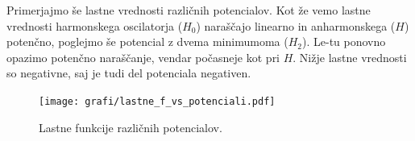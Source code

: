 \documentclass[12pt, a4paper]{article}
\begin{document}
Primerjajmo še lastne vrednosti različnih potencialov. Kot že vemo lastne vrednosti harmonskega oscilatorja ($H_0$) naraščajo linearno in anharmonskega ($H$) potenčno, poglejmo še potencial z dvema minimumoma ($H_2$). Le-tu ponovno opazimo potenčno naraščanje, vendar počasneje kot pri $H$. Nižje lastne vrednosti so negativne, saj je tudi del potenciala negativen.\\

  
\begin{figure}[hbtp]
  \begin{center}
  \texttt{[image: grafi/lastne\_f\_vs\_potenciali.pdf]}
  \caption{Lastne funkcije različnih potencialov.}
  \end{center}
\end{figure}
\end{document}
